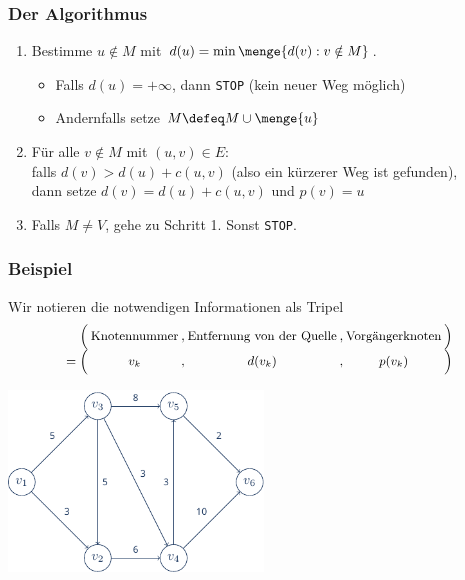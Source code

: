 \documentclass{beamer}
\begin{document}
\begin{frame} \frametitle{Der Algorithmus \cite{martinovic}}
	\begin{enumerate}
		\item Bestimme $u \notin M$ mit $d(u) = \min\menge{d(v) : v \notin M}$. 
		\begin{itemize}
			\item Falls $d(u) = +\infty$, dann \texttt{STOP} (kein neuer Weg möglich)
			\item Andernfalls setze $M \defeq M \cup \menge{u}$
		\end{itemize}
		\item Für alle $v \notin M$ mit $(u,v) \in E$:  \\
		falls $d(v) > d(u) + c(u,v)$ (also ein kürzerer Weg ist gefunden), \\
		dann setze $d(v) = d(u) + c(u,v)$ und $p(v) = u$
		\item Falls $M \neq V$, gehe zu Schritt 1. Sonst \texttt{STOP}.
	\end{enumerate}
\end{frame}

\begin{frame} \frametitle{Beispiel}
	Wir notieren die notwendigen Informationen als Tripel
	\begin{equation*}
	\small
	\setlength{\arraycolsep}{1pt}
	\begin{array}{rcccccc}
		\Big( & \text{Knotennummer} &,& \text{Entfernung von der Quelle} &,& \text{Vorgängerknoten} & \Big) \\
		= \Big( & v_k &,& d(v_k) &,& p(v_k) & \Big)
	\end{array}		
	\end{equation*}
	
	\centering
	\includegraphics[height=13em]{./beispiel.pdf}
\end{frame}
\end{document}
